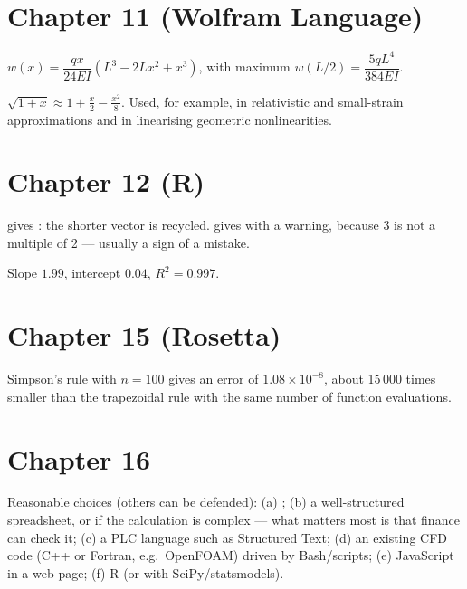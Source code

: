 \section*{Chapter 11 (Wolfram Language)}
\begin{description}[style=nextline,leftmargin=0pt,font=\normalfont]
\item[\AnswerRef{11.3}] $w(x) = \dfrac{q x}{24EI}\left(L^3 - 2Lx^2 + x^3\right)$, with maximum
  $w(L/2) = \dfrac{5qL^4}{384EI}$.
\item[\AnswerRef{11.4}] $\sqrt{1+x} \approx 1 + \tfrac{x}{2} - \tfrac{x^2}{8}$. Used, for example, in
  relativistic and small-strain approximations and in linearising geometric nonlinearities.
\end{description}

\section*{Chapter 12 (R)}
\begin{description}[style=nextline,leftmargin=0pt,font=\normalfont]
\item[\AnswerRef{12.3}]  gives :
  the shorter vector is recycled.  gives  with a
  warning, because 3 is not a multiple of 2 --- usually a sign of a mistake.
\item[\AnswerRef{12.4}] Slope $1.99$, intercept $0.04$, $R^2 = 0.997$.
\end{description}

\section*{Chapter 15 (Rosetta)}
\begin{description}[style=nextline,leftmargin=0pt,font=\normalfont]
\item[\AnswerRef{15.3}] Simpson's rule with $n = 100$ gives an error of $1.08\times10^{-8}$, about
  15\,000 times smaller than the trapezoidal rule with the same number of function
  evaluations.
\end{description}

\section*{Chapter 16}
\begin{description}[style=nextline,leftmargin=0pt,font=\normalfont]
\item[\AnswerRef{16.1}] Reasonable choices (others can be defended): (a) \py; (b) a well-structured
  spreadsheet, or \py if the calculation is complex --- what matters most is that finance can
  check it; (c) a PLC language such as Structured Text; (d) an existing CFD code (C++ or
  Fortran, e.g.\ OpenFOAM) driven by Bash/\py scripts; (e) JavaScript in a web page;
  (f) R (or \py with SciPy/statsmodels).
\end{description}
